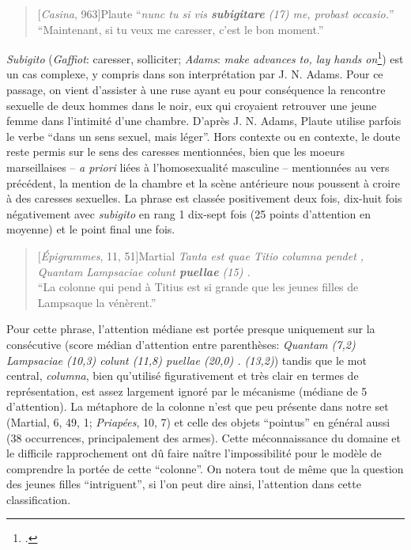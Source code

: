 \starbreak

\begin{quote}[\textit{Casina}, 963]{Plaute}
    \enquote{\textit{nunc tu si vis \textbf{subigitare} (17) me, probast occasio.}} \\
    \enquote{Maintenant, si tu veux me caresser, c'est le bon moment.}
\end{quote}

\textit{Subigito} (\textit{Gaffiot}: caresser, solliciter; \textit{Adams}: \textit{make advances to, lay hands on}\footcite[p. 323]{adams_prostitute}) est un cas complexe, y compris dans son interprétation par J. N. Adams. Pour ce passage, on vient d'assister à une ruse ayant eu pour conséquence la rencontre sexuelle de deux hommes dans le noir, eux qui croyaient retrouver une jeune femme dans l'intimité d'une chambre. D'après J. N. Adams, Plaute utilise parfois le verbe \enquote{dans un sens sexuel, mais léger}. Hors contexte ou en contexte, le doute reste permis sur le sens des caresses mentionnées, bien que les moeurs marseillaises -- \textit{a priori} liées à l'homosexualité masculine -- mentionnées au vers précédent, la mention de la chambre et la scène antérieure nous poussent à croire à des caresses sexuelles. La phrase est classée positivement deux fois, dix-huit fois négativement avec \textit{subigito} en rang 1 dix-sept fois (25 points d'attention en moyenne) et le point final une fois.

\starbreak

\begin{quote}[\textit{Épigrammes}, 11, 51]{Martial}
\textit{Tanta est quae Titio columna pendet , Quantam Lampsaciae colunt \textbf{puellae} (15) .}\\
\enquote{La colonne qui pend à Titius est si grande que les jeunes filles de Lampsaque la vénèrent.}
\end{quote}

Pour cette phrase, l'attention médiane est portée presque uniquement sur la consécutive (score médian d'attention entre parenthèses: \textit{Quantam (7,2) Lampsaciae (10,3) colunt (11,8) puellae (20,0) . (13,2)}) tandis que le mot central, \textit{columna}, bien qu'utilisé figurativement et très clair en termes de représentation, est assez largement ignoré par le mécanisme (médiane de 5 d'attention). La métaphore de la colonne n'est que peu présente dans notre set (Martial, 6, 49, 1; \textit{Priapées}, 10, 7) et celle des objets \enquote{pointus} en général aussi (38 occurrences, principalement des armes). Cette méconnaissance du domaine et le difficile rapprochement ont dû faire naître l'impossibilité pour le modèle de comprendre la portée de cette \enquote{colonne}. On notera  tout de même que la question des jeunes filles \enquote{intriguent}, si l'on peut dire ainsi, l'attention dans cette classification.

